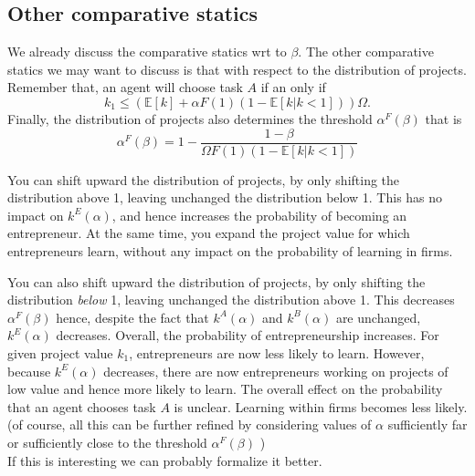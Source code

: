 \documentclass[12pt,american]{paper}
\theoremstyle{remark}
\newcommand{\E}[1]{\mathbb E[#1]}
\begin{document}
\subsection{Other comparative statics}

{\color{red} We already discuss the comparative statics wrt to $\beta$. The other comparative statics we may want to discuss is that with respect to the distribution of projects. Remember that, an agent will choose task $A$ if an only if
\[
k_1 \leq \left(\E{k} +\alpha F(1) (1-\E{k|k<1}) \right) \Omega.
\] 
Finally, the distribution of projects also determines the threshold $\alpha^F(\beta)$ that is
\[
\alpha^F(\beta) = 1-\frac{1-\beta}{\Omega F(1) (1-\E{k|k<1}) }
\]

You can shift upward the distribution of projects, by only shifting the distribution above 1, leaving unchanged the distribution  below 1. This has no impact on $k^E(\alpha)$, and hence increases the probability of becoming an entrepreneur. At the same time,  you expand the project value for which entrepreneurs learn, without any impact on the probability of learning in firms. 

You can also shift upward the distribution of projects, by only shifting the distribution \textit{below} 1, leaving unchanged the distribution  above 1. This decreases $\alpha^F(\beta)$ hence, despite the fact that $k^A(\alpha)$ and $k^B(\alpha)$ are unchanged, $k^E(\alpha)$ decreases. Overall, the probability of entrepreneurship increases. For given project value $k_1$, entrepreneurs are now less likely to learn. However, because $k^E(\alpha)$ decreases, there are now entrepreneurs working on projects of low value and hence more likely to learn. The overall effect on the probability that an agent chooses task $A$ is unclear. Learning within firms becomes less likely. (of course, all this can be further refined by considering values of $\alpha$ sufficiently far or sufficiently close to the threshold $\alpha^F(\beta)$ )
\\
If this is interesting we can probably formalize it better.


}

\end{document}

